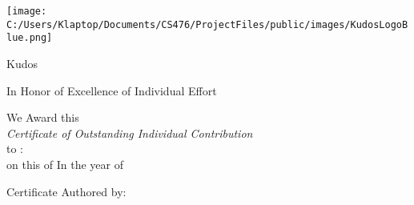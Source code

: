 \documentclass[landscape, 14pt]{article}
\begin{document}
\centering
\begin{minipage}{.9\textwidth}
\centering
\texttt{[image: C:/Users/Klaptop/Documents/CS476/ProjectFiles/public/images/KudosLogoBlue.png]}
\end{minipage}

\Huge Kudos\\
\vspace{1cm}

\Huge In Honor of Excellence of Individual Effort\par
\smallskip
{\Large We Award this\\}
\smallskip
\textit{\huge Certificate of Outstanding Individual Contribution\\}
\smallskip
{\Large to : \recvVar\\}
\smallskip
{\large on this \dayVar of \monVar In the year of \yearVar\\}
\vspace{1.5cm}
\begin{minipage}[t]{0.5\textwidth}
\centering
{\large Certificate Authored by:\\}
{\large \sendVar\\}
{\large \sendSig}
\end{minipage}
\end{document}
